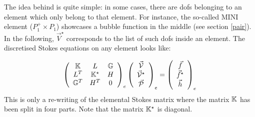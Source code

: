 
The idea behind  is quite simple: in some cases, there are dofs 
belonging to an element which only belong to that element. For instance, the so-called MINI 
element ($P_1^+ \times P_1$) showcases a bubble function in the middle (see section \ref{pair}). 
In the following, $\vec{V}^\star$ corresponds to the list of such dofs inside an element.
The discretised Stokes equations on any element looks like:

\begin{equation}
\left(
\begin{array}{ccc}
{\mathbb{K}}   & L & {\mathbb{G}} \\
L^T & {\mathbb{K}}^\star  & H \\
{\mathbb{G}}^T & H^T & 0
\end{array}
\right)_e
\left(
\begin{array}{c}
\vec{\cal V} \\ \vec{\cal V}^\star \\ \vec{\cal P}
\end{array}
\right)_e
=
\left(
\begin{array}{c}
\vec{f} \\ \vec{f}^\star \\ \vec{h}
\end{array}
\right)_e
\end{equation}
This is only a re-writing of the elemental Stokes matrix where the matrix ${\mathbb{K}}$ has been 
split in four parts.
Note that the matrix ${\mathbb{K}}^\star$ is diagonal.


